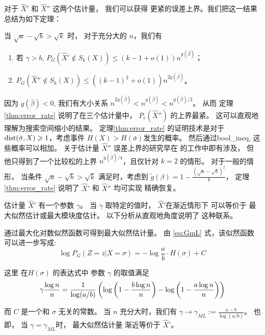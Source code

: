 对于 $\hat{X}'$ 和 $\hat{X}''$ 这两个估计量，
我们可以获得 更紧的误差上界。我们把这一结果总结为如下定理：
\begin{theorem}\label{thm:error_rate}
当 $\sqrt{a} - \sqrt{b} > \sqrt{k}$ 时，
对于充分大的 $n$，我们有 
\begin{enumerate}
	\item 若 $\gamma > b$, $P_G(\hat{X}' \not\in S_k(X)) \leq (k-1+o(1))n^{g(\bar{\beta})}$；
	\item $P_G(\hat{X}'' \not\in S_k(X)) \leq ((k-1)^2+o(1))n^{2g(\bar{\beta})}$。
\end{enumerate}
\end{theorem}
因为 $g(\bar{\beta})<0$, 我们有大小关系 $n^{2g(\bar{\beta})} < n^{g(\bar{\beta})} < n^{g(\bar{\beta})/2}$。
从而 定理 \ref{thm:error_rate} 说明了在三个估计量中，
$P_e(\hat{X}'')$ 
的上界最紧。
这可以直观地理解为搜索空间缩小的结果。
定理\ref{thm:error_rate} 的证明技术是对于 $\operatorname{dist}(\bar{\sigma}, X) \geqslant 1$，考虑事件
$H(X) > H(\bar{\sigma})$发生的概率。
然后通过\gls{bool_ineq}, 这些概率可以相加。
关于估计量 $\hat{X}''$ 误差上界的研究早在\citet{abbe2015exact} 的工作中即有涉及，
但他只得到了一个比较松的上界 $n^{g(\bar{\beta})/4}$，且仅针对 $k=2$ 的情形。
对于一般的情形，
当条件
$\sqrt{a} - \sqrt{b} > \sqrt{k}$ 满足时，考虑到
$\tilde{g}(\beta) = 1- \frac{(\sqrt{a} - \sqrt{b})^2}{k}$，
定理 \ref{thm:error_rate} 说明了  $\hat{X}'$ 和 $\hat{X}''$
均可实现
精确恢复。


估计量 $\hat{X}'$ 有一个参数 $\gamma$。
当 $\gamma$ 取特定的值时， $\hat{X}'$在渐近情形下
可以等价于 最大似然估计或最大模块度估计。
以下分析从直观地角度说明了
这种联系。

通过最大化对数似然函数可得到最大似然估计量。
由 \eqref{eq:GmL} 式，该似然函数可以进一步写成:
\begin{equation}\label{eq:PG_energy}
	\log P_G(Z=z|X=\sigma) = -\log\frac{a}{b} \cdot H(\sigma) + C
\end{equation}

这里 在$H(\sigma)$ 的表达式中 参数 $\gamma$ 的取值满足
\begin{equation}\label{eq:special_gamma_ML}
	\gamma \frac{\log n}{n} = \frac{1}{\log(a/b)}
	\left(\log \left(1-\frac{b \log n}{n} \right) - \log \left(1-\frac{a \log n}{n} \right) \right)	 
\end{equation}

而 $C$ 是一个和 $\sigma$ 无关的常数。
当 $n$ 充分大时，我们有 $\gamma \to \gamma_{ML} := \frac{a-b}{\log(a/b)}$。   
也即，
当 $\gamma = \gamma_{ML}$时，
最大似然估计量 渐近等价于 $\hat{X}'$。

